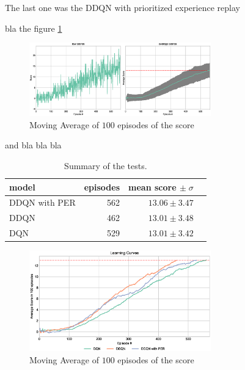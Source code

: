 \documentclass[a4paper]{article}
\begin{document}
The last one was the DDQN with prioritized experience replay

bla the figure \ref{fig:ddqnper}


\begin{figure}[ht]
\centering
\includegraphics[width=0.7\textwidth]{../notebooks/figures/2018-08-23-ddqnpre-learning-curve.eps}
\caption{Moving Average of $100$ episodes of the score}
\label{fig:ddqnper}
\end{figure}


and bla bla bla


\begin{table}[ht!]
\centering
\begin{tabular}{lrrr}
{model} &  episodes &  mean score $\pm \;\sigma$ \\
\midrule
DDQN with PER &       562 &       $13.06\pm3.47$ \\
DDQN          &       462 &       $13.01\pm3.48$ \\
DQN           &       529 &       $13.01\pm3.42$ \\

\end{tabular}
\caption{\label{tab:final_results}Summary of the tests.}
\end{table}


\begin{figure}[ht]
\centering
\includegraphics[width=0.7\textwidth]{../notebooks/figures/2018-08-23-final-comparition-2.eps}
\caption{Moving Average of $100$ episodes of the score}
\label{fig:final_comp}
\end{figure}
\end{document}
